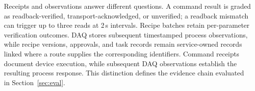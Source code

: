 Receipts and observations answer different questions. A command result is
graded as readback-verified, transport-acknowledged, or unverified; a
readback mismatch can trigger up to three reads at 2\,s intervals. Recipe
batches retain per-parameter verification outcomes. DAQ stores subsequent
timestamped process observations, while recipe versions, approvals, and
task records remain service-owned records linked where a route supplies the
corresponding identifiers. Command receipts document device execution, while
subsequent DAQ observations establish the resulting process response. This
distinction defines the evidence chain evaluated in Section~\ref{sec:eval}.
